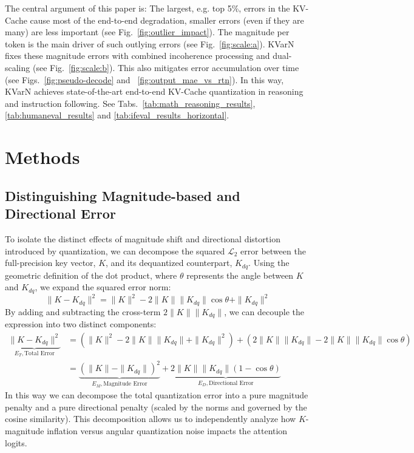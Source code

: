 \documentclass{article}
\newcommand{\methodname}{KVarN\xspace}
\begin{document}
The central argument of this paper is:  The largest, e.g. top 5\%, errors in the KV-Cache cause most of the end-to-end degradation, smaller errors (even if they are many) are less important (see Fig.~\ref{fig:outlier_impact}). The magnitude per token is the main driver of such outlying errors (see Fig.~\ref{fig:scale:a}). \methodname fixes these magnitude errors with combined incoherence processing and dual-scaling (see Fig.~\ref{fig:scale:b}). This also mitigates error accumulation over time (see Figs.~\ref{fig:pseudo-decode} and ~\ref{fig:output_mae_vs_rtn}). In this way, \methodname achieves state-of-the-art end-to-end KV-Cache quantization in reasoning and instruction following. See Tabs.~\ref{tab:math_reasoning_results}, \ref{tab:humaneval_results} and \ref{tab:ifeval_results_horizontal}.


\section{Methods}

\subsection{Distinguishing Magnitude-based and Directional Error}
To isolate the distinct effects of magnitude shift and directional distortion introduced by quantization, we can decompose the squared $\mathcal{L}_2$ error between the full-precision key vector, $K$, and its dequantized counterpart, $K_{dq}$. Using the geometric definition of the dot product, where $\theta$ represents the angle between $K$ and $K_{dq}$, we expand the squared error norm:
\begin{equation}
    \|K - K_{dq}\|^2 = \|K\|^2 - 2\|K\|\|K_{dq}\|\cos\theta + \|K_{dq}\|^2
\end{equation}
By adding and subtracting the cross-term $2\|K\|\|K_{dq}\|$, we can decouple the expression into two distinct components:
\begin{align}
    \underbrace{\|K - K_{dq}\|^2}_{E_T, \text{Total Error}} &= \left( \|K\|^2 - 2\|K\|\|K_{dq}\| + \|K_{dq}\|^2 \right) + \left( 2\|K\|\|K_{dq}\| - 2\|K\|\|K_{dq}\|\cos\theta \right) \nonumber \\
    &= \underbrace{\left( \|K\| - \|K_{dq}\| \right)^2}_{E_M, \text{Magnitude Error}} + \underbrace{2\|K\|\|K_{dq}\|(1 - \cos\theta)}_{E_D, \text{Directional Error}}
    \label{eq:decompose}
\end{align}
In this way we can decompose the total quantization error into a pure magnitude penalty and a pure directional penalty (scaled by the norms and governed by the cosine similarity). This decomposition allows us to independently analyze how $K$-magnitude inflation versus angular quantization noise impacts the attention logits.
\end{document}
